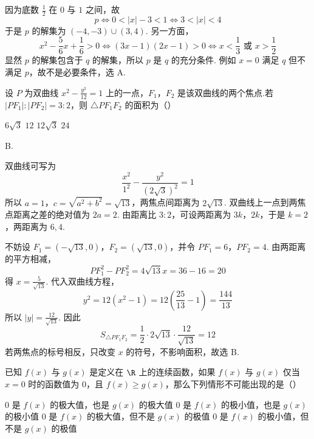 \begin{solution}
因为底数 \(\frac{1}{2}\) 在 \(0\) 与 \(1\) 之间，故
\[
p\Longleftrightarrow 0<|x|-3<1
\Longleftrightarrow 3<|x|<4
\]
于是 \(p\) 的解集为 \((-4,-3)\cup(3,4)\). 另一方面，
\[
x^2-\frac{5}{6}x+\frac{1}{6}>0
\Longleftrightarrow (3x-1)(2x-1)>0
\Longleftrightarrow x<\frac{1}{3}\text{ 或 }x>\frac{1}{2}
\]
显然 \(p\) 的解集包含于 \(q\) 的解集，所以 \(p\) 是 \(q\) 的充分条件. 例如 \(x=0\) 满足 \(q\) 但不满足 \(p\)，故不是必要条件，选 A.
\end{solution}


\begin{problem}
设 \(P\) 为双曲线 \(x^2 - \frac{y^2}{12} = 1\) 上的一点，\(F_1\)，\(F_2\) 是该双曲线的两个焦点.若 \(|PF_1| : |PF_2| = 3 : 2\)，则 \(\triangle PF_1F_2\) 的面积为（\quad）

\choices
    {\(6\sqrt{3}\)}
    {\(12\)}
    {\(12\sqrt{3}\)}
    {\(24\)}
\end{problem}

\begin{answer}
B.
\end{answer}

\begin{solution}
双曲线可写为
\[
\frac{x^2}{1^2}-\frac{y^2}{(2\sqrt{3})^2}=1
\]
所以 \(a=1\)，\(c=\sqrt{a^2+b^2}=\sqrt{13}\)，两焦点间距离为 \(2\sqrt{13}\). 双曲线上一点到两焦点距离之差的绝对值为 \(2a=2\). 由距离比 \(3:2\)，可设两距离为 \(3k\)，\(2k\)，于是 \(k=2\)，两距离为 \(6,4\).

不妨设 \(F_1=(-\sqrt{13},0)\)，\(F_2=(\sqrt{13},0)\)，并令 \(PF_1=6\)，\(PF_2=4\). 由两距离的平方相减，
\[
PF_1^2-PF_2^2=4\sqrt{13}x=36-16=20
\]
得 \(x=\frac{5}{\sqrt{13}}\). 代入双曲线方程，
\[
y^2=12\left(x^2-1\right)=12\left(\frac{25}{13}-1\right)=\frac{144}{13}
\]
所以 \(|y|=\frac{12}{\sqrt{13}}\). 因此
\[
S_{\triangle PF_1F_2}=\frac{1}{2}\cdot2\sqrt{13}\cdot\frac{12}{\sqrt{13}}=12
\]
若两焦点的标号相反，只改变 \(x\) 的符号，不影响面积，故选 B.
\end{solution}


\begin{problem}
已知 \(f(x)\) 与 \(g(x)\) 是定义在 \(\R\) 上的连续函数，如果 \(f(x)\) 与 \(g(x)\) 仅当 \(x = 0\) 时的函数值为 \(0\)，且 \(f(x) \geqslant g(x)\)，那么下列情形不可能出现的是（\quad）

\choices
    {\(0\) 是 \(f(x)\) 的极大值，也是 \(g(x)\) 的极大值}
    {\(0\) 是 \(f(x)\) 的极小值，也是 \(g(x)\) 的极小值}
    {\(0\) 是 \(f(x)\) 的极大值，但不是 \(g(x)\) 的极值}
    {\(0\) 是 \(f(x)\) 的极小值，但不是 \(g(x)\) 的极值}
\end{problem}

